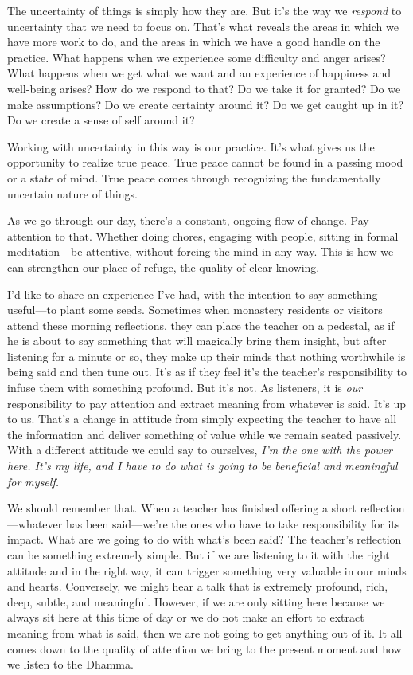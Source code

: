 The uncertainty of things is simply how they are. But it's the way we 
\emph{respond} to uncertainty that we need to focus on. That's what 
reveals the areas in which we have more work to do, and the areas in 
which we have a good handle on the practice. What happens when we 
experience some difficulty and anger arises? What happens when we get 
what we want and an experience of happiness and well-being arises? How 
do we respond to that? Do we take it for granted? Do we make 
assumptions? Do we create certainty around it? Do we get caught up in 
it? Do we create a sense of self around it?

Working with uncertainty in this way is our practice. It's what gives 
us the opportunity to realize true peace. True peace cannot be found in 
a passing mood or a state of mind. True peace comes through recognizing 
the fundamentally uncertain nature of things.

As we go through our day, there's a constant, ongoing flow of change. 
Pay attention to that. Whether doing chores, engaging with people, 
sitting in formal meditation---be attentive, without forcing the mind 
in any way. This is how we can strengthen our place of refuge, the 
quality of clear knowing.


I'd like to share an experience I've had, with the intention to say 
something useful---to plant some seeds. Sometimes when monastery 
residents or visitors attend these morning reflections, they can place 
the teacher on a pedestal, as if he is about to say something that will 
magically bring them insight, but after listening for a minute or so, 
they make up their minds that nothing worthwhile is being said and then 
tune out. It's as if they feel it's the teacher's responsibility to 
infuse them with something profound. But it's not. As listeners, it is 
\emph{our} responsibility to pay attention and extract meaning from 
whatever is said. It's up to us. That's a change in attitude from 
simply expecting the teacher to have all the information and deliver 
something of value while we remain seated passively. With a different 
attitude we could say to ourselves, \emph{I'm the one with the power 
here. It's my life, and I have to do what is going to be beneficial and 
meaningful for myself.}

We should remember that. When a teacher has finished offering a short 
reflection---whatever has been said---we're the ones who have to take 
responsibility for its impact. What are we going to do with what's been 
said? The teacher's reflection can be something extremely simple. But 
if we are listening to it with the right attitude and in the right way, 
it can trigger something very valuable in our minds and hearts. 
Conversely, we might hear a talk that is extremely profound, rich, 
deep, subtle, and meaningful. However, if we are only sitting here 
because we always sit here at this time of day or we do not make an 
effort to extract meaning from what is said, then we are not going to 
get anything out of it. It all comes down to the quality of attention 
we bring to the present moment and how we listen to the Dhamma.

